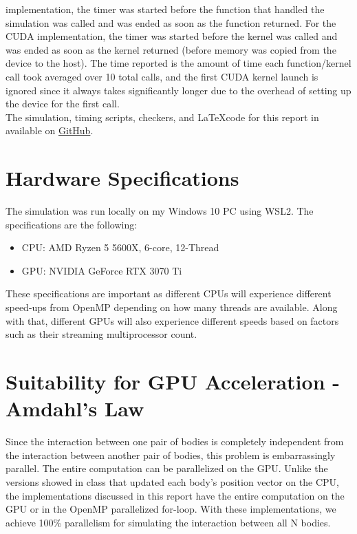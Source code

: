 implementation, the timer was started before the function that handled the simulation was called and
was ended as soon as the function returned. For the CUDA implementation, the timer was started before
the kernel was called and was ended as soon as the kernel returned (before memory was copied from the 
device to the host). The time reported is the amount of time each function/kernel call took
averaged over 10 total calls, and the first CUDA kernel launch is ignored since it always 
takes significantly longer due to the overhead of setting up the device for the first call.\\
\indent The simulation, timing scripts, checkers, and \LaTeX code for this report
in available on \href{https://github.com/robertfeliciano/nbody}{GitHub}.
\section{Hardware Specifications} 
The simulation was run locally on my Windows 10 PC using WSL2. The specifications are the following:
\begin{itemize}
    \item CPU: AMD Ryzen 5 5600X, 6-core, 12-Thread
    \item GPU: NVIDIA GeForce RTX 3070 Ti
\end{itemize}
These specifications are important as different CPUs will experience different speed-ups
from OpenMP depending on how many threads are available. Along with that, different GPUs
will also experience different speeds based on factors such as their streaming multiprocessor
count.

\section{Suitability for GPU Acceleration - Amdahl's Law}
Since the interaction between one pair of bodies is completely independent from the 
interaction between another pair of bodies, this problem is embarrassingly parallel. 
The entire computation can be parallelized on the GPU. Unlike the versions showed in 
class that updated each body's position vector on the CPU, the implementations 
discussed in this report have the entire computation on the GPU or in the OpenMP 
parallelized for-loop. With these implementations, we achieve 100\% parallelism for simulating
the interaction between all N bodies.


